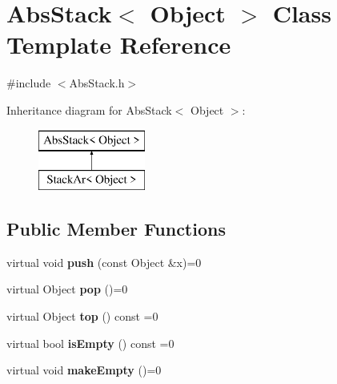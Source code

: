\hypertarget{class_abs_stack}{}\section{Abs\+Stack$<$ Object $>$ Class Template Reference}
\label{class_abs_stack}


{\ttfamily \#include $<$Abs\+Stack.\+h$>$}

Inheritance diagram for Abs\+Stack$<$ Object $>$\+:\begin{figure}[H]
\begin{center}
\leavevmode
\includegraphics[height=2.000000cm]{class_abs_stack}
\end{center}
\end{figure}
\subsection*{Public Member Functions}
\begin{DoxyCompactItemize}
\item 
virtual void {\bfseries push} (const Object \&x)=0\hypertarget{class_abs_stack_ace9c9f220a85a96e3202af54356a8e26}{}\label{class_abs_stack_ace9c9f220a85a96e3202af54356a8e26}

\item 
virtual Object {\bfseries pop} ()=0\hypertarget{class_abs_stack_a4d93c845ee748069f7e88841ad80b864}{}\label{class_abs_stack_a4d93c845ee748069f7e88841ad80b864}

\item 
virtual Object {\bfseries top} () const  =0\hypertarget{class_abs_stack_a41a96b855f3995dacfeb58ff02b8011b}{}\label{class_abs_stack_a41a96b855f3995dacfeb58ff02b8011b}

\item 
virtual bool {\bfseries is\+Empty} () const  =0\hypertarget{class_abs_stack_a7da72befef800cb78f1d96e6e3e2886c}{}\label{class_abs_stack_a7da72befef800cb78f1d96e6e3e2886c}

\item 
virtual void {\bfseries make\+Empty} ()=0\hypertarget{class_abs_stack_a29ab79afef511d86b1d504b37b660599}{}\label{class_abs_stack_a29ab79afef511d86b1d504b37b660599}

\end{DoxyCompactItemize}


